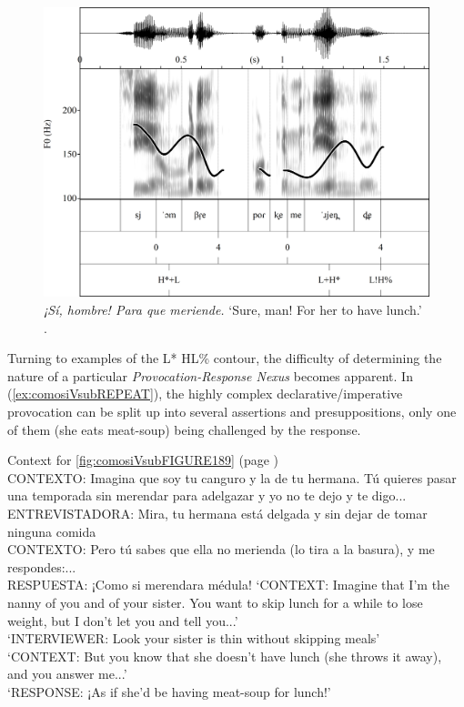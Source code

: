 \begin{figure}
	\includegraphics[width=.95\linewidth]{gfx/figure_si_hombre_por_que_REPEAT_ELVIRA_GARCIA.png}
	\caption[\textit{¡Sí, hombre! Para que meriende.}]{\textit{¡Sí, hombre! Para que meriende.} `Sure, man! For her to have lunch.' \citep{ElviraGarcia.2016}.}\label{fig:paraquemeriendeLHLHfigurerepeat}
\end{figure}

Turning to examples of the L* HL\% contour, the difficulty of determining the nature of a particular \textit{Provocation-Response Nexus} becomes apparent. In (\ref{ex:comosiVsubREPEAT}), the highly complex declarative/imperative provocation can be split up into several assertions and presuppositions, only one of them (she eats meat-soup) being challenged by the response.

\begin{exe}
	\ex  \label{ex:comosiVsubREPEAT} Context for \autoref{fig:comosiVsubFIGURE189} (page \pageref{fig:comosiVsubFIGURE189})\\
	CONTEXTO: Imagina que soy tu canguro y la de tu hermana. Tú quieres pasar
	una temporada sin merendar para adelgazar y yo no te dejo y te digo...\\
	ENTREVISTADORA: Mira, tu hermana está delgada y sin dejar de tomar ninguna comida \\
	CONTEXTO: Pero tú sabes que ella no merienda (lo tira a la basura), y me respondes:... \\
	RESPUESTA: ¡Como si merendara médula!
	\glt `CONTEXT: Imagine that I'm the nanny of you and of your sister. You want to skip lunch for a while to lose weight, but I don't let you and tell you...'\\
    `INTERVIEWER: Look your sister is thin without skipping meals' \\
    `CONTEXT: But you know that she doesn't have lunch (she throws it away), and you answer me...' \\
	`RESPONSE: ¡As if she'd be having meat-soup for lunch!'
\end{exe}

